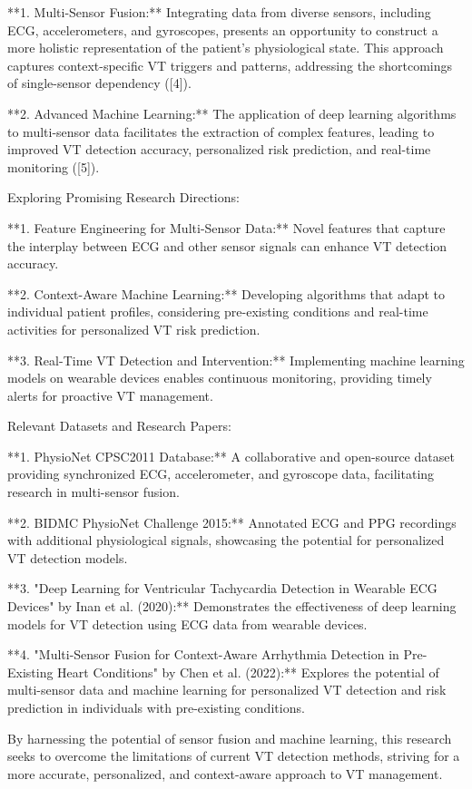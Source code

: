 **1. Multi-Sensor Fusion:** Integrating data from diverse sensors, including ECG, accelerometers, and gyroscopes, presents an opportunity to construct a more holistic representation of the patient's physiological state. This approach captures context-specific VT triggers and patterns, addressing the shortcomings of single-sensor dependency ([4]).

**2. Advanced Machine Learning:** The application of deep learning algorithms to multi-sensor data facilitates the extraction of complex features, leading to improved VT detection accuracy, personalized risk prediction, and real-time monitoring ([5]).

Exploring Promising Research Directions:

**1. Feature Engineering for Multi-Sensor Data:** Novel features that capture the interplay between ECG and other sensor signals can enhance VT detection accuracy.

**2. Context-Aware Machine Learning:** Developing algorithms that adapt to individual patient profiles, considering pre-existing conditions and real-time activities for personalized VT risk prediction.

**3. Real-Time VT Detection and Intervention:** Implementing machine learning models on wearable devices enables continuous monitoring, providing timely alerts for proactive VT management.

Relevant Datasets and Research Papers:

**1. PhysioNet CPSC2011 Database:** A collaborative and open-source dataset providing synchronized ECG, accelerometer, and gyroscope data, facilitating research in multi-sensor fusion.

**2. BIDMC PhysioNet Challenge 2015:** Annotated ECG and PPG recordings with additional physiological signals, showcasing the potential for personalized VT detection models.

**3. "Deep Learning for Ventricular Tachycardia Detection in Wearable ECG Devices" by Inan et al. (2020):** Demonstrates the effectiveness of deep learning models for VT detection using ECG data from wearable devices.

**4. "Multi-Sensor Fusion for Context-Aware Arrhythmia Detection in Pre-Existing Heart Conditions" by Chen et al. (2022):** Explores the potential of multi-sensor data and machine learning for personalized VT detection and risk prediction in individuals with pre-existing conditions.

By harnessing the potential of sensor fusion and machine learning, this research seeks to overcome the limitations of current VT detection methods, striving for a more accurate, personalized, and context-aware approach to VT management.